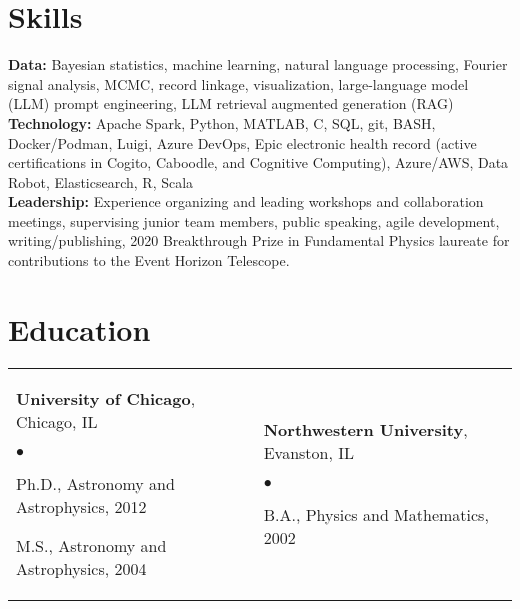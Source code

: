 \documentclass[margin,line, 11pt]{res}
\newenvironment{list2}{
  \begin{list}{$\bullet$}{%
      \setlength{\itemsep}{0in}
      \setlength{\parsep}{0in} \setlength{\parskip}{0in}
      \setlength{\topsep}{0in} \setlength{\partopsep}{0in}
      \setlength{\leftmargin}{0.2in}}}{\end{list}}
\begin{document}
\begin{resume}
\section{Skills}
\textbf{Data:} Bayesian statistics, machine learning, natural language processing, Fourier signal analysis, MCMC, record linkage, visualization, large-language model (LLM) prompt engineering, LLM retrieval augmented generation (RAG)\\
\textbf{Technology:} Apache Spark, Python, MATLAB, C, SQL, git, BASH, Docker/Podman, Luigi, Azure DevOps, Epic electronic health record (active certifications in Cogito, Caboodle, and Cognitive Computing), Azure/AWS, Data Robot, Elasticsearch, R, Scala\\
\textbf{Leadership:} Experience organizing and leading workshops and collaboration meetings, supervising junior team members, public speaking, agile development, writing/publishing, 2020 Breakthrough Prize in Fundamental Physics laureate for contributions to the Event Horizon Telescope. \\
\vspace*{-7mm}

\section{Education}
\begin{tabular}{@{}p{3in}p{3in}}
  \textbf{University of Chicago}, Chicago, IL
  \begin{list2}
  	\item Ph.D., Astronomy and Astrophysics, 2012
    \item M.S., Astronomy and Astrophysics, 2004
  \end{list2} &
  \textbf{Northwestern University}, Evanston, IL
  \begin{list2}
  	\item B.A., Physics and Mathematics, 2002
  \end{list2} \\
\end{tabular}
\vspace*{-4mm}

\end{resume}
\end{document}
